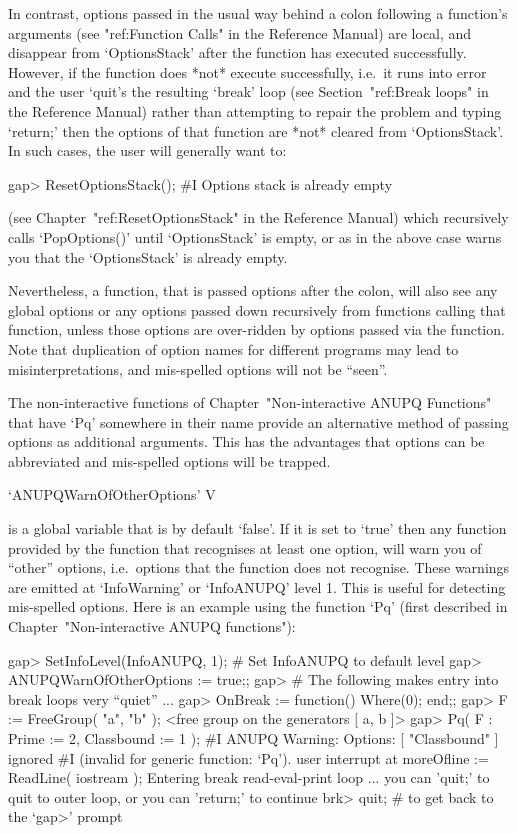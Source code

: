 In contrast, options passed in the usual way behind a colon  following  a
function's arguments (see "ref:Function Calls" in  the  {\GAP}  Reference
Manual) are local, and disappear from `OptionsStack' after  the  function
has executed successfully. However, if the function  does  *not*  execute
successfully, i.e.~it runs into error and the user `quit's the  resulting
`break' loop (see Section~"ref:Break  loops"  in  the  Reference  Manual)
rather than attempting to repair the problem and  typing  `return;'  then
the options of that function are *not* cleared  from  `OptionsStack'.  In
such cases, the user will generally want to:

\beginexample
gap> ResetOptionsStack();
#I  Options stack is already empty
\endexample

(see Chapter~"ref:ResetOptionsStack"  in  the  {\GAP}  Reference  Manual)
which recursively calls `PopOptions()' until `OptionsStack' is empty, or
as in the above case warns you that the `OptionsStack' is already empty.

Nevertheless, a function, that is passed options after  the  colon,  will
also see any global options or any options passed down  recursively  from
functions calling that function, unless those options are over-ridden  by
options passed via the function. Note that duplication  of  option  names
for different programs may lead to  misinterpretations,  and  mis-spelled
options will not be ``seen''.

The   non-interactive   functions   of   Chapter~"Non-interactive   ANUPQ
Functions" that have `Pq' somewhere in their name provide an  alternative
method  of  passing  options  as  additional  arguments.  This  has   the
advantages that options can be abbreviated and mis-spelled  options  will
be trapped.

\>`ANUPQWarnOfOtherOptions' V

is a global variable that is by default `false'. If it is set  to  `true'
then any function provided by the {\ANUPQ} function  that  recognises  at
least one option, will warn you of ``other'' options,  i.e.~options  that
the  function  does  not  recognise.  These  warnings  are   emitted   at
`InfoWarning' or `InfoANUPQ'  level  1.  This  is  useful  for  detecting
mis-spelled options. Here is an example using the  function  `Pq'  (first
described in Chapter~"Non-interactive ANUPQ functions"):

\begintt
gap> SetInfoLevel(InfoANUPQ, 1);        # Set InfoANUPQ to default level
gap> ANUPQWarnOfOtherOptions := true;;
gap> # The following makes entry into break loops very ``quiet'' ...
gap> OnBreak := function() Where(0); end;;
gap> F := FreeGroup( "a", "b" );
<free group on the generators [ a, b ]>
gap> Pq( F : Prime := 2, Classbound := 1 );
#I  ANUPQ Warning: Options: [ "Classbound" ] ignored
#I  (invalid for generic function: `Pq').
user interrupt at
moreOfline := ReadLine( iostream );
Entering break read-eval-print loop ...
you can 'quit;' to quit to outer loop, or
you can 'return;' to continue
brk> quit; # to get back to the `gap>' prompt
\endtt

